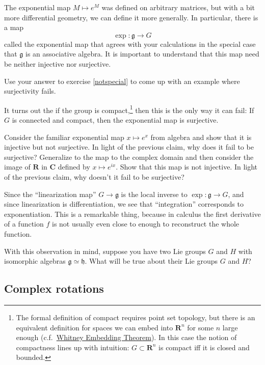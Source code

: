 The exponential map $M ↦ e^M$ was defined on arbitrary matrices, but with a bit more differential geometry, we can define it more generally. In particular, there is a map
$$
\exp : 𝔤 → G
$$
called the exponential map that agrees with your calculations in the special case that $𝔤$ is an associative algebra.
It is important to understand that this map need be neither injective nor surjective. 
\begin{exercise}
Use your answer to exercise \ref{notspecial} to come up with an example where surjectivity fails. 
\end{exercise}
It turns out the if the group is compact,\footnote{The formal definition of compact requires point set topology, but there is an equivalent definition for spaces we can embed into $𝐑^n$ for some $n$ large enough (c.f.\ \href{https://en.wikipedia.org/wiki/Whitney_embedding_theorem}{Whitney Embedding Theorem}). In this case the notion of compactness lines up with intuition: $G ⊂ 𝐑^n$ is compact iff it is closed and bounded.} then this is the only way it can fail: If $G$ is connected and compact, then the exponential map is surjective. 
\begin{exercise}
Consider the familiar exponential map $x ↦ e^x$ from algebra and show that it is injective but not surjective. 
In light of the previous claim, why does it fail to be surjective?
Generalize to the map to the complex domain and then consider the image of $𝐑$ in $𝐂$ defined by $x↦ e^{ix}$. Show that this map is not injective. In light of the previous claim, why doesn't it fail to be surjective?
\end{exercise}
Since the “linearization map” $G→ 𝔤$ is the local inverse to $\exp: 𝔤 → G$, and since linearization is differentiation, we see that “integration” corresponds to exponentiation. This is a remarkable thing, because in calculus the first derivative of a function $f$ is not usually even close to enough to reconstruct the whole function. 
\begin{exercise}
\label{localiso}
With this observation in mind, suppose you have two Lie groups $G$ and $H$ with isomorphic algebras $𝔤 ≃ 𝔥$. 
What will be true about their Lie groups $G$ and $H$?
\end{exercise}




\subsection{Complex rotations}


